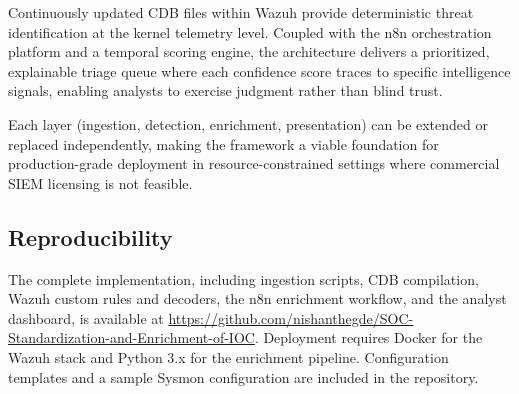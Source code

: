 \documentclass[conference]{IEEEtran}
\begin{document}
Continuously updated CDB files within Wazuh provide deterministic threat identification at the kernel telemetry level. Coupled with the n8n orchestration platform and a temporal scoring engine, the architecture delivers a prioritized, explainable triage queue where each confidence score traces to specific intelligence signals, enabling analysts to exercise judgment rather than blind trust.

Each layer (ingestion, detection, enrichment, presentation) can be extended or replaced independently, making the framework a viable foundation for production-grade deployment in resource-constrained settings where commercial SIEM licensing is not feasible.

\subsection*{Reproducibility}
The complete implementation, including ingestion scripts, CDB compilation, Wazuh custom rules and decoders, the n8n enrichment workflow, and the analyst dashboard, is available at \url{https://github.com/nishanthegde/SOC-Standardization-and-Enrichment-of-IOC}. Deployment requires Docker for the Wazuh stack and Python 3.x for the enrichment pipeline. Configuration templates and a sample Sysmon configuration are included in the repository.
\end{document}
